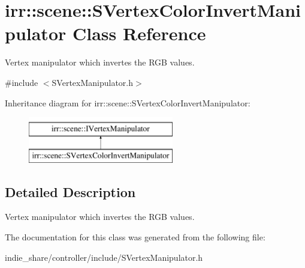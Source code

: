 \hypertarget{classirr_1_1scene_1_1SVertexColorInvertManipulator}{}\section{irr\+:\+:scene\+:\+:S\+Vertex\+Color\+Invert\+Manipulator Class Reference}
\label{classirr_1_1scene_1_1SVertexColorInvertManipulator}


Vertex manipulator which invertes the R\+GB values.  




{\ttfamily \#include $<$S\+Vertex\+Manipulator.\+h$>$}

Inheritance diagram for irr\+:\+:scene\+:\+:S\+Vertex\+Color\+Invert\+Manipulator\+:\begin{figure}[H]
\begin{center}
\leavevmode
\includegraphics[height=2.000000cm]{classirr_1_1scene_1_1SVertexColorInvertManipulator}
\end{center}
\end{figure}


\subsection{Detailed Description}
Vertex manipulator which invertes the R\+GB values. 

The documentation for this class was generated from the following file\+:\begin{DoxyCompactItemize}
\item 
indie\+\_\+share/controller/include/S\+Vertex\+Manipulator.\+h\end{DoxyCompactItemize}
